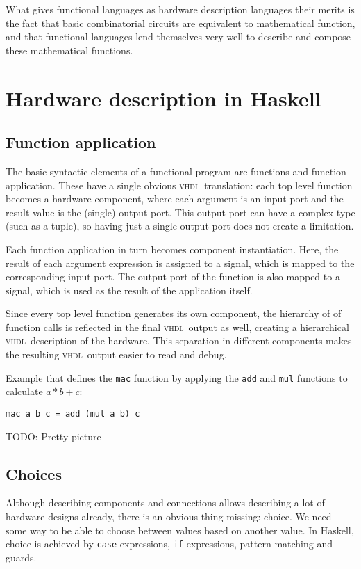 \documentclass[conference,pdf,a4paper,10pt,final,twoside,twocolumn]{IEEEtran}
\def\VHDL{\textsc{vhdl}}
\def\hs#1{\texttt{#1}}
\begin{document}
What gives functional languages as hardware description languages their merits is the fact that basic combinatorial circuits are equivalent to mathematical function, and that functional languages lend themselves very well to describe and compose these mathematical functions.
\section{Hardware description in Haskell}

  \subsection{Function application}
    The basic syntactic elements of a functional program are functions
    and function application. These have a single obvious \VHDL\
    translation: each top level function becomes a hardware component,
    where each argument is an input port and the result value is the
    (single) output port. This output port can have a complex type (such
    as a tuple), so having just a single output port does not create a
    limitation.

    Each function application in turn becomes component instantiation.
    Here, the result of each argument expression is assigned to a
    signal, which is mapped to the corresponding input port. The output
    port of the function is also mapped to a signal, which is used as
    the result of the application itself.

    Since every top level function generates its own component, the
    hierarchy of of function calls is reflected in the final \VHDL\
    output as well, creating a hierarchical \VHDL\ description of the
    hardware.  This separation in different components makes the
    resulting \VHDL\ output easier to read and debug.

    Example that defines the \texttt{mac} function by applying the
    \texttt{add} and \texttt{mul} functions to calculate $a * b + c$:

\begin{verbatim}
mac a b c = add (mul a b) c
\end{verbatim}

    TODO: Pretty picture

  \subsection{Choices }
    Although describing components and connections allows describing a
    lot of hardware designs already, there is an obvious thing missing:
    choice. We need some way to be able to choose between values based
    on another value.  In Haskell, choice is achieved by \hs{case}
    expressions, \hs{if} expressions, pattern matching and guards.
\end{document}
